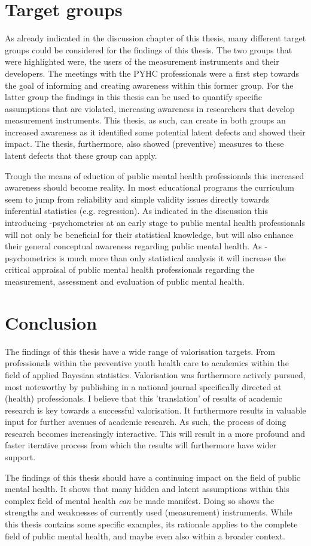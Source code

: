 \section*{Target groups}
As already indicated in the discussion chapter of this thesis, many different target groups could be considered for the findings of this thesis. 
The two groups that were highlighted were, the users of the measurement instruments and their developers. 
The meetings with the PYHC professionals were a first step towards the goal of informing and creating awareness within this former group. 
For the latter group the findings in this thesis can be used to quantify specific assumptions that are violated, increasing awareness in researchers that develop measurement instruments. 
This thesis, as such, can create in both groups an increased awareness as it identified some potential latent defects and showed their impact. 
The thesis, furthermore, also showed (preventive) measures to these latent defects that these group can apply.  

Trough the means of eduction of public mental health professionals this increased awareness should become reality. 
In most educational programs the curriculum seem to jump from reliability and simple validity issues directly towards inferential statistics (e.g. regression). 
As indicated in the discussion this introducing \textbeta-psychometrics at an early stage to public mental health professionals will not only be beneficial for their statistical knowledge, but will also enhance their general conceptual awareness regarding public mental health. 
As \textbeta-psychometrics is much more than only statistical analysis it will increase the critical appraisal of public mental health professionals regarding the measurement, assessment and evaluation of public mental health. 

\section*{Conclusion}
The findings of this thesis have a wide range of valorisation targets. 
From professionals within the preventive youth health care to academics within the field of applied Bayesian statistics. 
Valorisation was furthermore actively pursued, most noteworthy by publishing in a national journal specifically directed at (health) professionals. 
I believe that this 'translation' of results of academic research is key towards a successful valorisation. 
It furthermore results in valuable input for further avenues of academic research. 
As such, the process of doing research becomes increasingly interactive. 
This will result in a more profound and faster iterative process from which the results will furthermore have wider support.

The findings of this thesis should have a continuing impact on the field of public mental health. 
It shows that many hidden and latent assumptions within this complex field of mental health \textit{can} be made manifest. 
Doing so shows the strengths and weaknesses of currently used (measurement) instruments. 
While this thesis contains some specific examples, its rationale applies to the complete field of public mental health, and maybe even also within a broader context.